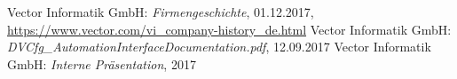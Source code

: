 \begin{thebibliography}{99}
	 Vector Informatik GmbH: \emph{Firmengeschichte}, 01.12.2017, \url{https://www.vector.com/vi\_company-history\_de.html}
	 Vector Informatik GmbH: \emph{DVCfg\_AutomationInterfaceDocumentation.pdf}, 12.09.2017
	 Vector Informatik GmbH: \emph{Interne Pr\"asentation}, 2017
\end{thebibliography}